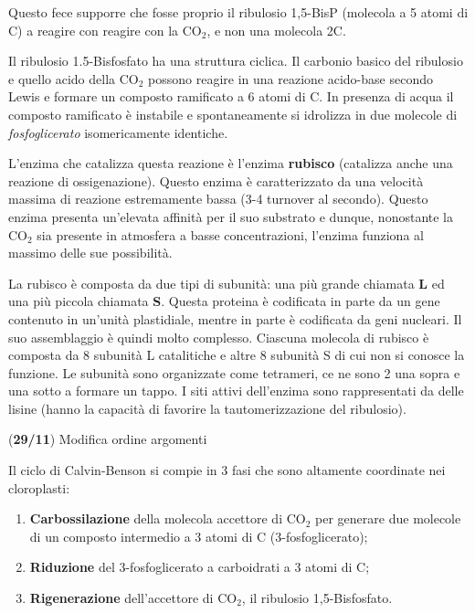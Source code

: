 \documentclass[]{article}
\begin{document}
Questo fece supporre che fosse proprio il ribulosio 1,5-BisP (molecola a
5 atomi di C) a reagire con reagire con la CO$_2$, e non una molecola
2C.

Il ribulosio 1.5-Bisfosfato ha una struttura ciclica. Il carbonio basico
del ribulosio e quello acido della CO$_2$ possono reagire in una
reazione acido-base secondo Lewis e formare un composto ramificato a 6
atomi di C. In presenza di acqua il composto ramificato è instabile e
spontaneamente si idrolizza in due molecole di \emph{fosfoglicerato}
isomericamente identiche.

L'enzima che catalizza questa reazione è l'enzima \textbf{rubisco}
(catalizza anche una reazione di ossigenazione). Questo enzima è
caratterizzato da una velocità massima di reazione estremamente bassa
(3-4 turnover al secondo). Questo enzima presenta un'elevata affinità
per il suo substrato e dunque, nonostante la CO$_2$ sia presente in
atmosfera a basse concentrazioni, l'enzima funziona al massimo delle sue
possibilità.

La rubisco è composta da due tipi di subunità: una più grande chiamata
\textbf{L} ed una più piccola chiamata \textbf{S}. Questa proteina è
codificata in parte da un gene contenuto in un'unità plastidiale, mentre
in parte è codificata da geni nucleari. Il suo assemblaggio è quindi
molto complesso. Ciascuna molecola di rubisco è composta da 8 subunità L
catalitiche e altre 8 subunità S di cui non si conosce la funzione. Le
subunità sono organizzate come tetrameri, ce ne sono 2 una sopra e una
sotto a formare un tappo. I siti attivi dell'enzima sono rappresentati
da delle lisine (hanno la capacità di favorire la tautomerizzazione del
ribulosio).

(\textbf{29/11}) Modifica ordine argomenti

Il ciclo di Calvin-Benson si compie in 3 fasi che sono altamente
coordinate nei cloroplasti:

\begin{enumerate}
\def\labelenumi{\arabic{enumi}.}
\itemsep1pt\parskip0pt
\item
  \textbf{Carbossilazione} della molecola accettore di CO$_2$ per
  generare due molecole di un composto intermedio a 3 atomi di C
  (3-fosfoglicerato);
\item
  \textbf{Riduzione} del 3-fosfoglicerato a carboidrati a 3 atomi di C;
\item
  \textbf{Rigenerazione} dell'accettore di CO$_2$, il ribulosio
  1,5-Bisfosfato.
\end{enumerate}
\end{document}
